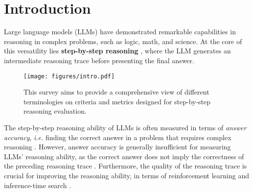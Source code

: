 \section{Introduction}
\label{sec:introduction}
% 

Large language models (LLMs) have demonstrated remarkable capabilities in reasoning in complex problems, such as logic, math, and science. At the core of this versatility lies \textbf{step-by-step reasoning} \citep{NEURIPS2022_9d560961, NEURIPS2022_8bb0d291}, where the LLM generates an intermediate reasoning trace before presenting the final answer.


\begin{figure}
    \centering
    \texttt{[image: figures/intro.pdf]}
    \caption{This survey aims to provide a comprehensive view of different terminologies on criteria and metrics designed for step-by-step reasoning evaluation.}
    \label{fig:intro}
\end{figure}

The step-by-step reasoning ability of LLMs is often measured in terms of \textit{answer accuracy}, \textit{i.e.} finding the correct answer in a problem that requires complex reasoning  \citep{openai2024gpt4technicalreport, groeneveld-etal-2024-olmo, deepseekai2025deepseekr1incentivizingreasoningcapability}. However, answer accuracy is generally insufficient for measuring LLMs' reasoning ability, as the correct answer does not imply the correctness of the preceding reasoning trace \citep{lanham2023measuringfaithfulnesschainofthoughtreasoning, mirzadeh2024gsmsymbolicunderstandinglimitationsmathematical, paul-etal-2024-making}. Furthermore, the quality of the reasoning trace is crucial for improving the reasoning ability, in terms of reinforcement learning \citep{lu2024stepcontrolleddpoleveragingstepwise, qwenlmQwQReflect, deepseekai2025deepseekr1incentivizingreasoningcapability} and inference-time search \citep{DBLP:conf/iclr/0002WSLCNCZ23, NEURIPS2023_271db992}.


